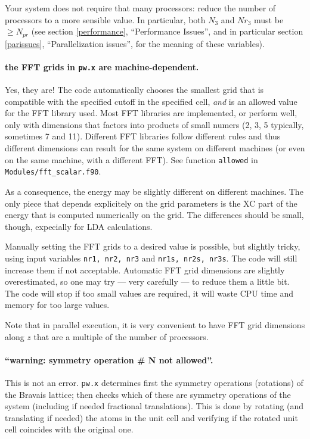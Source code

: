 \documentclass[12pt,a4paper]{article}
\begin{document}
Your system does not require that many processors: reduce the number
of processors to a more sensible value.
In particular, both $N_3$ and $Nr_3$ must be $\geq N_{pr}$ (see
section \ref{performance}, ``Performance Issues'', and in particular
section \ref{parissues}, ``Parallelization issues'', for the meaning
of these variables).

\paragraph{the FFT grids in \texttt{pw.x} are machine-dependent.}

Yes, they are!
The code automatically chooses the smallest grid that is compatible
with the specified cutoff in the specified cell, \emph{and} is an
allowed value for the FFT library used.
Most FFT libraries are implemented, or perform well, only with
dimensions that factors into products of small numers (2, 3, 5
typically, sometimes 7 and 11).
Different FFT libraries follow different rules and thus different
dimensions can result for the same system on different machines (or
even on the same machine, with a different FFT).
See function \texttt{allowed} in \texttt{Modules/fft\_scalar.f90}.

As a consequence, the energy may be slightly different on different
machines.
The only piece that depends explicitely on the grid parameters is the
XC part of the energy that is computed numerically on the grid.
The differences should be small, though, expecially for LDA
calculations.

Manually setting the FFT grids to a desired value is possible, but
slightly tricky, using input variables \texttt{nr1, nr2, nr3} and
\texttt{nr1s, nr2s, nr3s}.
The code will still increase them if not acceptable.
Automatic FFT grid dimensions are slightly overestimated, so one may
try --- very carefully --- to reduce them a little bit.
The code will stop if too small values are required, it will waste CPU
time and memory for too large values.

Note that in parallel execution, it is very convenient to have FFT
grid dimensions along $z$ that are a multiple of the number of
processors.

\paragraph{``warning: symmetry operation \# N not allowed''.}

This is not an error.
\texttt{pw.x} determines first the symmetry operations (rotations)
of the Bravais lattice; then checks which of these are symmetry
operations of the system (including if needed fractional
translations).
This is done by rotating (and translating if needed) the atoms in
the unit cell and verifying if the rotated unit cell coincides
with the original one. 
\end{document}
